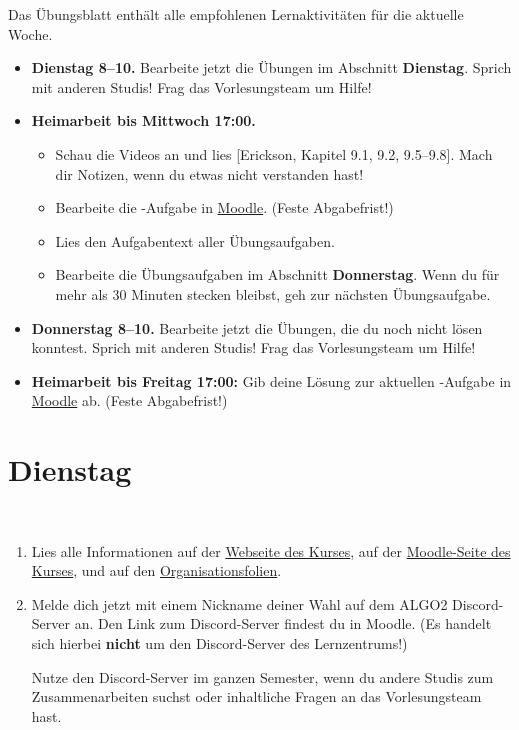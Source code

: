 \documentclass{uebung_cs}
\begin{document}
Das Übungsblatt enthält alle empfohlenen Lernaktivitäten für die aktuelle Woche.

\begin{itemize}
\item \textbf{Dienstag 8--10.} Bearbeite jetzt die Übungen im Abschnitt \textbf{Dienstag}. Sprich mit anderen Studis! Frag das Vorlesungsteam um Hilfe!
\item \textbf{Heimarbeit bis Mittwoch 17:00.}
\begin{itemize}
\item 
Schau die Videos an und lies [Erickson, Kapitel 9.1, 9.2, 9.5--9.8]. Mach dir Notizen, wenn du etwas nicht verstanden hast!
\item Bearbeite die -Aufgabe in \href{https://moodle.studiumdigitale.uni-frankfurt.de/moodle/course/view.php?id=2241}{Moodle}. (Feste Abgabefrist!)
\item Lies den Aufgabentext aller Übungsaufgaben.
\item Bearbeite die Übungsaufgaben im Abschnitt \textbf{Donnerstag}. Wenn du für mehr als 30 Minuten stecken bleibst, geh zur nächsten Übungsaufgabe.
\end{itemize}
\item \textbf{Donnerstag 8--10.} Bearbeite jetzt die Übungen, die du noch nicht lösen konntest. Sprich mit anderen Studis! Frag das Vorlesungsteam um Hilfe!
\item \textbf{Heimarbeit bis Freitag 17:00:} Gib deine Lösung zur aktuellen -Aufgabe in \href{https://moodle.studiumdigitale.uni-frankfurt.de/moodle/course/view.php?id=2241}{Moodle} ab. (Feste Abgabefrist!)
\end{itemize}

\section*{Dienstag}

\begin{aufgabe}[Orga]\
  \begin{enumerate}
    \item Lies alle Informationen auf der \href{https://tcs.uni-frankfurt.de/algo2/}{Webseite des Kurses}, auf der \href{https://moodle.studiumdigitale.uni-frankfurt.de/moodle/course/view.php?id=2241}{Moodle-Seite des Kurses}, und auf den \href{https://tcs.uni-frankfurt.de/algo2/organisation.pdf}{Organisationsfolien}.
    \item Melde dich jetzt mit einem Nickname deiner Wahl auf dem ALGO2 Discord-Server an. Den Link zum Discord-Server findest du in Moodle. (Es handelt sich hierbei \textbf{nicht} um den Discord-Server des Lernzentrums!)

    Nutze den Discord-Server im ganzen Semester, wenn du andere Studis zum Zusammenarbeiten suchst oder inhaltliche Fragen an das Vorlesungsteam hast.
  \end{enumerate}
\end{aufgabe}
\end{document}
